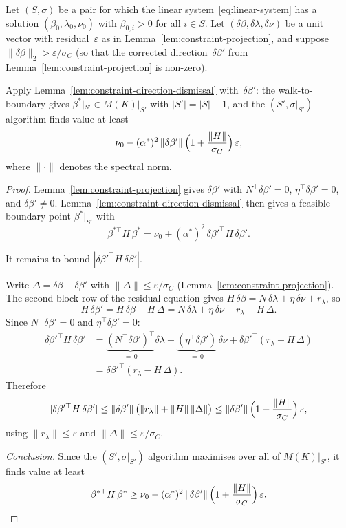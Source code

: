 \begin{proposition}%
\label{prop:approximate-dismissal}
Let $(S, \sigma)$ be a pair for which the linear
system~\eqref{eq:linear-system} has a solution
$(\beta_0, \lambda_0, \nu_0)$ with $\beta_{0,i} > 0$ for all
$i \in S$.
Let $(\delta\beta, \delta\lambda, \delta\nu)$ be a unit vector
with residual~$\varepsilon$ as in
Lemma~\ref{lem:constraint-projection},
and suppose $\|\delta\beta\|_2 > \varepsilon / \sigma_C$
(so that the corrected direction~$\delta\beta'$ from
Lemma~\ref{lem:constraint-projection} is non-zero).

Apply Lemma~\ref{lem:constraint-direction-dismissal}
with~$\delta\beta'$: the walk-to-boundary gives
$\beta^*|_{S'} \in M(K)|_{S'}$ with $|S'| = |S| - 1$,
and the $(S', \sigma|_{S'})$ algorithm finds value at least
\[
  \nu_0
    - (\alpha^*)^2\,\|\delta\beta'\|\,
      \Bigl(1 + \frac{\|H\|}{\sigma_C}\Bigr)\,\varepsilon,
\]
where $\|\cdot\|$ denotes the spectral norm.
\end{proposition}

\begin{proof}
Lemma~\ref{lem:constraint-projection} gives $\delta\beta'$
with $N^\top\delta\beta' = 0$,
$\eta^\top\delta\beta' = 0$, and $\delta\beta' \neq 0$.
Lemma~\ref{lem:constraint-direction-dismissal} then gives a
feasible boundary point $\beta^*|_{S'}$ with
\[
  \beta^{*\top} H\,\beta^*
  = \nu_0
    + (\alpha^*)^2\,\delta\beta'^\top H\,\delta\beta'.
\]

It remains to bound
$|\delta\beta'^\top H\,\delta\beta'|$.

Write $\Delta = \delta\beta - \delta\beta'$
with $\|\Delta\| \leq \varepsilon/\sigma_C$
(Lemma~\ref{lem:constraint-projection}).
The second block row of the residual equation gives
$H\,\delta\beta = N\,\delta\lambda + \eta\,\delta\nu + r_\lambda$,
so
\[
  H\,\delta\beta'
  = H\,\delta\beta - H\,\Delta
  = N\,\delta\lambda + \eta\,\delta\nu + r_\lambda - H\,\Delta.
\]
Since $N^\top\delta\beta' = 0$ and $\eta^\top\delta\beta' = 0$:
\begin{align*}
  \delta\beta'^\top H\,\delta\beta'
  &= \underbrace{(N^\top\delta\beta')^\top}_{=\,0}\delta\lambda
    + \underbrace{(\eta^\top\delta\beta')}_{=\,0}\,\delta\nu
    + \delta\beta'^\top(r_\lambda - H\,\Delta) \\
  &= \delta\beta'^\top(r_\lambda - H\,\Delta).
\end{align*}
Therefore
\[
  |\delta\beta'^\top H\,\delta\beta'|
  \leq \|\delta\beta'\|\,
       \bigl(\|r_\lambda\| + \|H\|\,\|\Delta\|\bigr)
  \leq \|\delta\beta'\|\,
       \Bigl(1 + \frac{\|H\|}{\sigma_C}\Bigr)\,\varepsilon,
\]
using $\|r_\lambda\| \leq \varepsilon$ and
$\|\Delta\| \leq \varepsilon/\sigma_C$.

\emph{Conclusion.}
Since the $(S', \sigma|_{S'})$ algorithm maximises over
all of $M(K)|_{S'}$, it finds value at least
\[
  \beta^{*\top} H\,\beta^*
  \geq \nu_0
    - (\alpha^*)^2\,\|\delta\beta'\|\,
      \Bigl(1 + \frac{\|H\|}{\sigma_C}\Bigr)\,\varepsilon.
\]
\end{proof}

